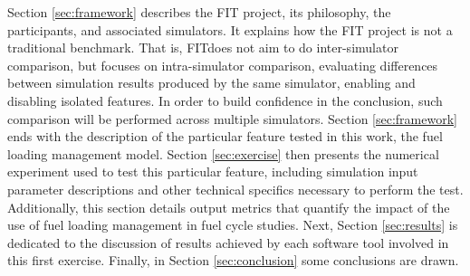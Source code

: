 Section \ref{sec:framework} describes the \gls{FIT} project, its philosophy, the participants, and associated simulators.
It explains how the \gls{FIT} project is not a traditional benchmark.
That is, \gls{FIT}does not aim to do inter-simulator comparison, but focuses on intra-simulator comparison, evaluating differences between simulation results produced by the same simulator, enabling and disabling isolated features.
In order to build confidence in the conclusion, such comparison will be performed across multiple simulators.
Section \ref{sec:framework} ends with the description of the particular feature tested in this work, the fuel loading management model.
Section \ref{sec:exercise} then presents the numerical experiment used to test this particular feature, including simulation input parameter descriptions and other technical specifics necessary to perform the test.
Additionally, this section details output metrics that quantify the impact of the use of fuel loading management in fuel cycle studies.
Next, Section \ref{sec:results} is dedicated to the discussion of results achieved by each software tool involved in this first exercise.
Finally, in Section \ref{sec:conclusion} some conclusions are drawn.
